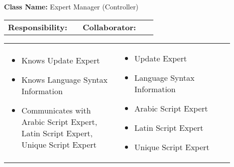 \begin{cards}[]
    \textbf{Class Name:} Expert Manager (Controller)
    \tcbline
    \begin{tabular}{p{0.45\linewidth} | p{0.45\linewidth}}
        \textbf{Responsibility:}& 
        \textbf{Collaborator:}\\
    \end{tabular}
    \tcbline
    \begin{tabular}{p{0.45\linewidth} | p{0.45\linewidth}}
        \begin{itemize}
            \item Knows Update Expert
            \item Knows Language Syntax Information
            \item Communicates with Arabic Script Expert, Latin Script Expert, Unique Script Expert
            
        \end{itemize}
        &
        \begin{itemize}
            \item Update Expert
            \item Language Syntax Information
            \item Arabic Script Expert
            \item Latin Script Expert
            \item Unique Script Expert
            
        \end{itemize}
    \end{tabular}
\end{cards}